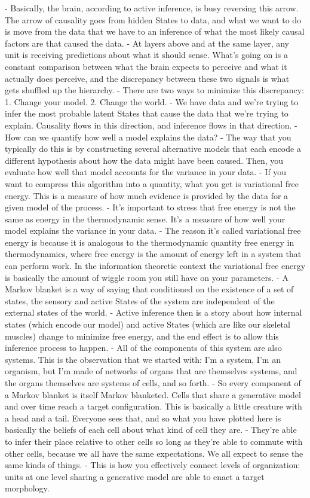 - Basically, the brain, according to active inference, is busy reversing this arrow. The arrow of causality goes from hidden States to data, and what we want to do is move from the data that we have to an inference of what the most likely causal factors are that caused the data.
- At layers above and at the same layer, any unit is receiving predictions about what it should sense. What's going on is a constant comparison between what the brain expects to perceive and what it actually does perceive, and the discrepancy between these two signals is what gets shuffled up the hierarchy.
- There are two ways to minimize this discrepancy:
	1. Change your model.
	2. Change the world.
- We have data and we're trying to infer the most probable latent States that cause the data that we're trying to explain. Causality flows in this direction, and inference flows in that direction.
- How can we quantify how well a model explains the data?
- The way that you typically do this is by constructing several alternative models that each encode a different hypothesis about how the data might have been caused. Then, you evaluate how well that model accounts for the variance in your data.
- If you want to compress this algorithm into a quantity, what you get is variational free energy. This is a measure of how much evidence is provided by the data for a given model of the process.
- It's important to stress that free energy is not the same as energy in the thermodynamic sense. It's a measure of how well your model explains the variance in your data.
- The reason it's called variational free energy is because it is analogous to the thermodynamic quantity free energy in thermodynamics, where free energy is the amount of energy left in a system that can perform work. In the information theoretic context the variational free energy is basically the amount of wiggle room you still have on your parameters.
- A Markov blanket is a way of saying that conditioned on the existence of a set of states, the sensory and active States of the system are independent of the external states of the world.
- Active inference then is a story about how internal states (which encode our model) and active States (which are like our skeletal muscles) change to minimize free energy, and the end effect is to allow this inference process to happen.
- All of the components of this system are also systems. This is the observation that we started with: I'm a system, I'm an organism, but I'm made of networks of organs that are themselves systems, and the organs themselves are systems of cells, and so forth.
- So every component of a Markov blanket is itself Markov blanketed. Cells that share a generative model and over time reach a target configuration. This is basically a little creature with a head and a tail. Everyone sees that, and so what you have plotted here is basically the beliefs of each cell about what kind of cell they are.
- They're able to infer their place relative to other cells so long as they're able to commute with other cells, because we all have the same expectations. We all expect to sense the same kinds of things.
- This is how you effectively connect levels of organization: units at one level sharing a generative model are able to enact a target morphology.

